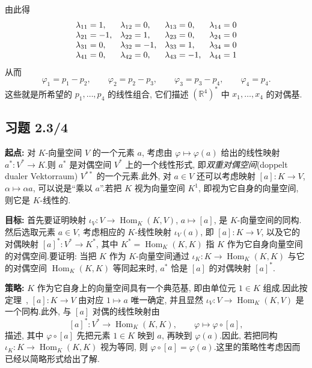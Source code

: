 由此得
\[
\begin{array}{l l l l}
\lambda_{11} = 1, & \lambda_{12} = 0, & \lambda_{13} = 0, & \lambda_{14} = 0\\
\lambda_{21} = -1, & \lambda_{22} = 1, & \lambda_{23} = 0, & \lambda_{24} = 0\\
\lambda_{31} = 0, & \lambda_{32} = -1, & \lambda_{33} = 1, & \lambda_{34} = 0\\
\lambda_{41} = 0, & \lambda_{42} = 0, & \lambda_{43} = -1, & \lambda_{44} = 1
\end{array}
\]
从而
\[
\varphi_1 = p_1 - p_2, \qquad \varphi_2 = p_2 - p_3, \qquad \varphi_3 = p_3 - p_4, \qquad \varphi_4 = p_4.
\]
这些就是所希望的 $p_1, \ldots, p_4$ 的线性组合, 它们描述 $(\mathbb{R}^4)^*$ 中 $x_1, \ldots, x_4$ 的对偶基.

\subsection*{习题 2.3/4}

\noindent\textbf{起点:} 对 $K$-向量空间 $V$ 的一个元素 $a$, 考虑由 $\varphi \longmapsto \varphi(a)$ 给出的线性映射 $a^* \colon V^* \longrightarrow K$.则 $a^*$ 是对偶空间 $V^*$ 上的一个线性形式, 即\emph{双重对偶空间}(\textup{doppelt dualer Vektorraum}) $V^{**}$ 的一个元素.此外, 对 $a \in V$ 还可以考虑映射 $[a] \colon K \longrightarrow V$, $\alpha \longmapsto \alpha a$, 可以说是``乘以 $a$''.若把 $K$ 视为向量空间 $K^1$, 即视为它自身的向量空间, 则它是 $K$-线性的.

\noindent\textbf{目标:} 首先要证明映射 $\iota_V \colon V \longrightarrow \operatorname{Hom}_K(K, V)$, $a \longmapsto [a]$, 是 $K$-向量空间的同构.然后选取元素 $a \in V$, 考虑相应的 $K$-线性映射 $\iota_V(a)$, 即 $[a] \colon K \longrightarrow V$, 以及它的对偶映射 $[a]^* \colon V^* \longrightarrow K^*$, 其中 $K^* = \operatorname{Hom}_K(K, K)$ 指 $K$ 作为它自身向量空间的对偶空间.要证明: 当把 $K$ 作为 $K$-向量空间通过 $\iota_K \colon K \longrightarrow \operatorname{Hom}_K(K, K)$ 与它的对偶空间 $\operatorname{Hom}_K(K, K)$ 等同起来时, $a^*$ 恰是 $[a]$ 的对偶映射 $[a]^*$.

\noindent\textbf{策略:} $K$ 作为它自身上的向量空间具有一个典范基, 即由单位元 $1 \in K$ 组成.因此按定理~, $[a] \colon K \longrightarrow V$ 由对应 $1 \longmapsto a$ 唯一确定, 并且显然 $\iota_V \colon V \longrightarrow \operatorname{Hom}_K(K, V)$ 是一个同构.此外, 与 $[a]$ 对偶的线性映射由
\[
[a]^* \colon V^* \longrightarrow \operatorname{Hom}_K(K, K), \qquad \varphi \longmapsto \varphi \circ [a],
\]
描述, 其中 $\varphi \circ [a]$ 先把元素 $1 \in K$ 映到 $a$, 再映到 $\varphi(a)$.因此, 若把同构 $\iota_K \colon K \longrightarrow \operatorname{Hom}_K(K, K)$ 视为等同, 则 $\varphi \circ [a] = \varphi(a)$.这里的策略性考虑因而已经以简略形式给出了解.

